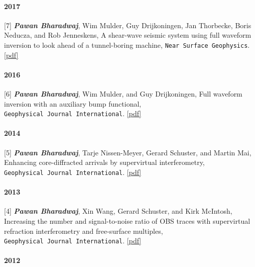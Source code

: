 \documentclass[9pt]{developercv} %
\begin{document}
\paragraph{2017}\label{section-21}

{[}7{]}
\textbf{\emph{Pawan
Bharadwaj}},
Wim
Mulder,
Guy
Drijkoningen,
Jan
Thorbecke,
Boris
Neducza,
and Rob
Jenneskens,
A
shear-wave
seismic
system
using full
waveform
inversion
to look
ahead of a
tunnel-boring
machine,
\texttt{Near\ Surface\ Geophysics}.
\href{https://github.com/pawbz/pawbz.github.io/blob/src/pdf/papers/NSG15_Bharadwaj.pdf}{{[}pdf{]}}

\paragraph{2016}\label{section-22}

{[}6{]}
\textbf{\emph{Pawan
Bharadwaj}},
Wim
Mulder,
and Guy
Drijkoningen,
Full
waveform
inversion
with an
auxiliary
bump
functional,
\texttt{Geophysical\ Journal\ International}.
\href{https://github.com/pawbz/pawbz.github.io/blob/src/pdf/papers/FWI_bump.pdf}{{[}pdf{]}}

\paragraph{2014}\label{section-23}

{[}5{]}
\textbf{\emph{Pawan
Bharadwaj}},
Tarje
Nissen-Meyer,
Gerard
Schuster,
and Martin
Mai,
Enhancing
core-diffracted
arrivals
by
supervirtual
interferometry,
\texttt{Geophysical\ Journal\ International}.
\href{https://github.com/pawbz/pawbz.github.io/blob/src/pdf/papers/GJI_CMB.pdf}{{[}pdf{]}}

\paragraph{2013}\label{section-24}

{[}4{]}
\textbf{\emph{Pawan
Bharadwaj}},
Xin Wang,
Gerard
Schuster,
and Kirk
McIntosh,
Increasing
the number
and
signal-to-noise
ratio of
OBS traces
with
supervirtual
refraction
interferometry
and
free-surface
multiples,
\texttt{Geophysical\ Journal\ International}.
\href{https://github.com/pawbz/pawbz.github.io/blob/src/pdf/papers/svi_GJI2.pdf}{{[}pdf{]}}

\paragraph{2012}\label{section-25}
\end{document}
